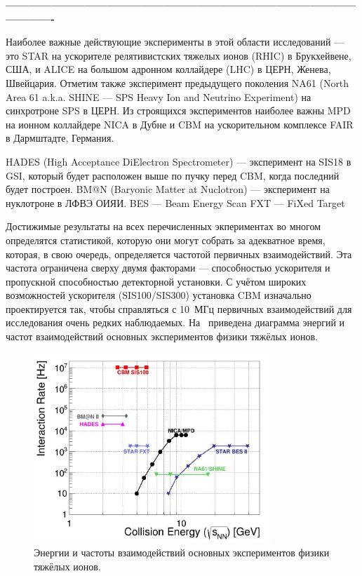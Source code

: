 \textbf{----------------------------------------------------------------------------------------------------------}







Наиболее важные действующие эксперименты в этой области исследований --- это STAR на ускорителе релятивистских тяжелых ионов (RHIC) в Брукхейвене, США, и ALICE на большом адронном коллайдере (LHC) в ЦЕРН, Женева, Швейцария. Отметим также эксперимент предыдущего поколения NA61 (North Area 61 a.k.a. SHINE --- SPS Heavy Ion and Neutrino Experiment) на синхротроне SPS в ЦЕРН. Из строящихся экспериментов наиболее важны MPD на ионном коллайдере NICA в Дубне и CBM на ускорительном комплексе FAIR в Дармштадте, Германия.

HADES (High Acceptance DiElectron Spectrometer) --- эксперимент на SIS18 в GSI, который будет расположен выше по пучку перед CBM, когда последний будет построен.
BM$@$N (Baryonic Matter at Nuclotron) --- эксперимент на нуклотроне в ЛФВЭ ОИЯИ.
BES --- Beam Energy Scan
FXT --- FiXed Target

Достижимые результаты на всех перечисленных экпериментах во многом определятся статистикой, которую они могут собрать за адекватное время, которая, в свою очередь, определяется частотой первичных взаимодействий. 
Эта частота ограничена сверху двумя факторами --- способностью ускорителя и пропускной способностью детекторной установки.
С учётом широких возможностей ускорителя (SIS100/SIS300) установка CBM изначально проектируется так, чтобы справляться с 10~МГц первичных взаимодействий для исследования очень редких наблюдаемых.
На~ приведена диаграмма энергий и частот взаимодействий основных экспериментов физики тяжёлых ионов.

\begin{figure}[H]
\includegraphics[width=0.8\textwidth]{pictures/Experiments.png}
\caption{Энергии и частоты взаимодействий основных экспериментов физики тяжёлых ионов.}
\label{fig:Experiments}
\end{figure}

